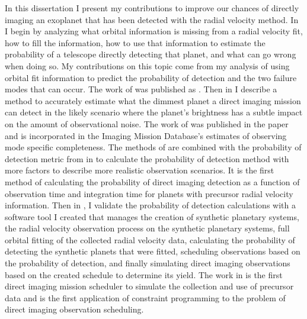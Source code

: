 In this dissertation I present my contributions to improve our chances of
directly imaging an exoplanet that has been detected with the radial velocity
method. In  I begin by analyzing what orbital information
is missing from a radial velocity fit, how to fill the information, how to use
that information to estimate the probability of a telescope directly detecting
that planet, and what can go wrong when doing so. My contributions on this
topic come from my analysis of using orbital fit information to predict the
probability of detection and the two failure modes that can occur. The work of
 was published as \citet{spohnSchedulingDirect2022}. Then
in  I describe a method to accurately estimate what the
dimmest planet a direct imaging mission can detect in the likely scenario where
the planet's brightness has a subtle impact on the amount of observational
noise. The work of  was published in the paper
\citet{spohnDirectImaging2022} and is incorporated in the Imaging Mission
Database's \citep{savranskyExplorationDynamical2019} estimates of observing
mode specific completeness. The methods of  are combined
with the probability of detection metric from  in
 to calculate the probability of detection method with
more factors to describe more realistic observation scenarios. It is the first
method of calculating the probability of direct imaging detection as a function
of observation time and integration time for planets with precursor radial
velocity information. Then in , I validate the
probability of detection calculations with a software tool I created that
manages the creation of synthetic planetary systems, the radial velocity
observation process on the synthetic planetary systems, full orbital fitting of
the collected radial velocity data, calculating the probability of detecting
the synthetic planets that were fitted, scheduling observations based on the
probability of detection, and finally simulating direct imaging observations
based on the created schedule to determine its yield. The work in
 is the first direct imaging mission scheduler to
simulate the collection and use of precursor data and is the first application
of constraint programming to the problem of direct imaging observation
scheduling.
